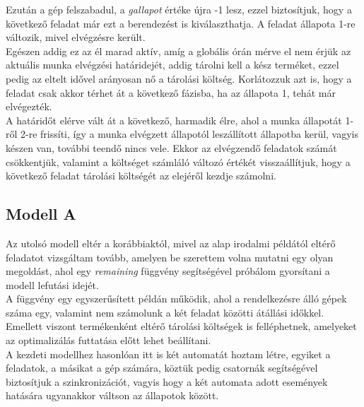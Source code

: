 \documentclass [12pt]{report}
\begin{document}
Ezután a gép felszabadul, a \emph{gallapot} értéke újra -1 lesz, ezzel biztosítjuk, hogy a következő feladat már ezt a berendezést is kiválaszthatja. A feladat állapota 1-re változik, mivel elvégzésre került.\\
Egészen addig ez az él marad aktív, amíg a globális órán mérve el nem érjük az aktuális munka elvégzési határidejét, addig tárolni kell a kész terméket, ezzel pedig az eltelt idővel arányosan nő a tárolási költség. Korlátozzuk azt is, hogy a feladat csak akkor térhet át a következő fázisba, ha az állapota 1, tehát már elvégezték. \\
A határidőt elérve vált át a következő, harmadik élre, ahol a munka állapotát 1-ről 2-re frissíti, így a munka elvégzett állapotól leszállított állapotba kerül, vagyis készen van, további teendő nincs vele. Ekkor az elvégzendő feladatok számát csökkentjük, valamint a költséget számláló változó értékét visszaállítjuk, hogy a következő feladat tárolási költségét az elejéről kezdje számolni.

\subsection{Modell A}
Az utolsó modell eltér a korábbiaktól, mivel az alap irodalmi példától eltérő feladatot vizsgáltam tovább, amelyen be szerettem volna mutatni egy olyan megoldást, ahol egy \emph{remaining} függvény segítségével próbálom gyorsítani a modell lefutási idejét. \\
A függvény egy egyszerűsített példán működik, ahol a rendelkezésre álló gépek száma egy, valamint nem számolunk a két feladat közötti átállási időkkel. Emellett viszont termékenként eltérő tárolási költségek is felléphetnek, amelyeket az optimalizálás futtatása előtt lehet beállítani.\\
A kezdeti modellhez hasonlóan itt is két automatát hoztam létre, egyiket a feladatok, a másikat a gép számára, köztük pedig csatornák segítségével biztosítjuk a szinkronizációt, vagyis hogy a két automata adott események hatására ugyanakkor váltson az állapotok között.
\end{document}
